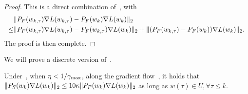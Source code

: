     \begin{proof}
        This is a direct combination of~, with
        \begin{align*}
            &\|  {P}_F(w_{k, \tau}) \nabla L(w_{k, \tau}) - {P}_F(w_k) \nabla L(w_k) \|_2 \\
            \le& \|  {P}_F(w_{k, \tau}) \nabla L(w_{k, \tau}) - {P}_F(w_{k, \tau}) \nabla L(w_k) \|_2  + \| ({P}_F(w_{k, \tau}) - {P}_F(w_k)) \nabla L(w_k) \|_2.
        \end{align*}
        The proof is then complete.
    \end{proof}


We will prove a discrete version of~.


\begin{lemma}
\label{lem:gdsg}
    Under~, when $\eta < 1 / \gamma_{\mathrm{max}}$, along the gradient flow~, it holds that $\| {P}_S(w_k) \nabla L(w_k)\|_2 \le 10 \kappa \| {P}_F(w_k) \nabla L(w_k)\|_2$ as long as $w(\tau) \in U, \forall \tau \le k$.
\end{lemma}




